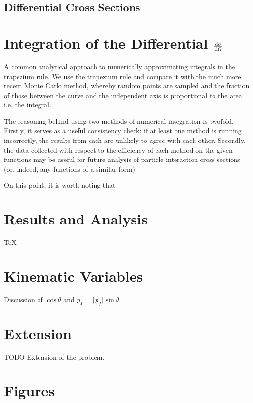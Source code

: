 \documentclass[]{article}
\begin{document}
\subsection{Differential Cross Sections}




\section{Integration of the Differential $\frac{\,\operatorname{d}\!{\sigma}}{\,\operatorname{d}\!{\Omega}}$}\label{sec:integration}

A common analytical approach to numerically approximating integrals in the trapezium rule. We use the trapezium rule and compare it with the much more recent Monte Carlo method, whereby random points are sampled and the fraction of those between the curve and the independent axis is proportional to the area i.e. the integral.

The reasoning behind using two methods of numerical integration is twofold. Firstly, it serves as a useful consistency check: if at least one method is running incorrectly, the results from each are unlikely to agree with each other. Secondly, the data collected with respect to the efficiency of each method on the given functions may be useful for future analysis of particle interaction cross sections (or, indeed, any functions of a similar form).

On this point, it is worth noting that 


\section{Results and Analysis}\label{sec:results}

\TeX


\section{Kinematic Variables}\label{sec:variables}

Discussion of $\cos{\theta}$ and $p_{T} = \lvert\vec{p}_{f}\rvert\sin{\theta}$.


\section{Extension}\label{sec:extension}

TODO Extension of the problem.


\section{Figures}
\end{document}
